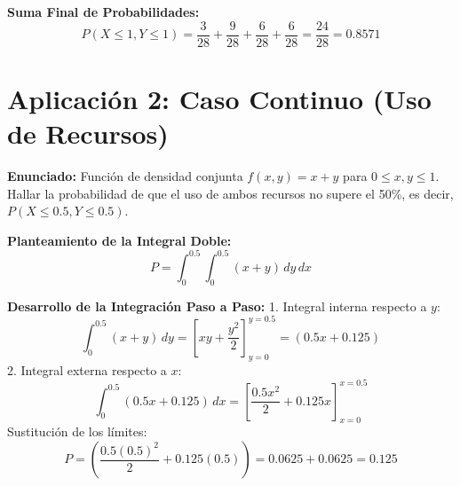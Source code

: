 \documentclass[12pt,a4paper]{article}
\begin{document}
\textbf{Suma Final de Probabilidades:}
\[ P(X \le 1, Y \le 1) = \frac{3}{28} + \frac{9}{28} + \frac{6}{28} + \frac{6}{28} = \frac{24}{28} = \mathbf{0.8571} \]

\section{Aplicación 2: Caso Continuo (Uso de Recursos)}
\textbf{Enunciado:} Función de densidad conjunta $f(x,y) = x + y$ para $0 \le x, y \le 1$. Hallar la probabilidad de que el uso de ambos recursos no supere el 50\%, es decir, $P(X \le 0.5, Y \le 0.5)$.

\textbf{Planteamiento de la Integral Doble:}
\[ P = \int_{0}^{0.5} \int_{0}^{0.5} (x + y) \, dy \, dx \]

\textbf{Desarrollo de la Integración Paso a Paso:}
1. Integral interna respecto a $y$:
\[ \int_{0}^{0.5} (x + y) \, dy = \left[ xy + \frac{y^2}{2} \right]_{y=0}^{y=0.5} = (0.5x + 0.125) \]
2. Integral externa respecto a $x$:
\[ \int_{0}^{0.5} (0.5x + 0.125) \, dx = \left[ \frac{0.5x^2}{2} + 0.125x \right]_{x=0}^{x=0.5} \]
Sustitución de los límites:
\[ P = \left( \frac{0.5(0.5)^2}{2} + 0.125(0.5) \right) = 0.0625 + 0.0625 = \mathbf{0.125} \]
\end{document}
